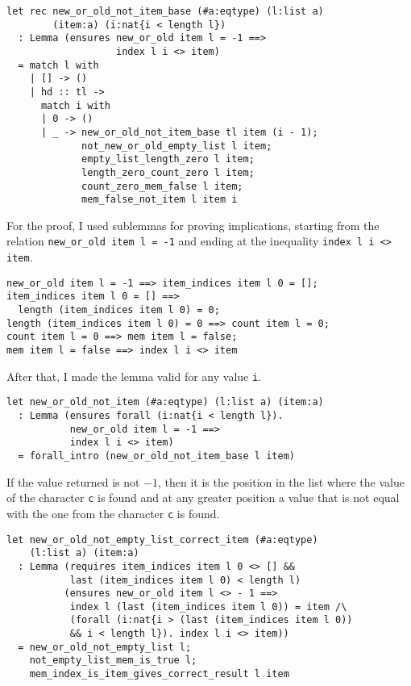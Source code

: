 \begin{verbatim}
let rec new_or_old_not_item_base (#a:eqtype) (l:list a)
        (item:a) (i:nat{i < length l})
  : Lemma (ensures new_or_old item l = -1 ==>
                   index l i <> item)
  = match l with 
    | [] -> ()
    | hd :: tl -> 
      match i with 
      | 0 -> ()
      | _ -> new_or_old_not_item_base tl item (i - 1);
             not_new_or_old_empty_list l item;
             empty_list_length_zero l item;
             length_zero_count_zero l item;
             count_zero_mem_false l item;
             mem_false_not_item l item i
\end{verbatim}

For the proof, I used sublemmas for proving implications, starting from the relation \texttt{new\_or\_old item l = -1} and ending at the inequality \texttt{index l i <> item}.

\begin{verbatim}
new_or_old item l = -1 ==> item_indices item l 0 = [];
item_indices item l 0 = [] ==> 
  length (item_indices item l 0) = 0;
length (item_indices item l 0) = 0 ==> count item l = 0;
count item l = 0 ==> mem item l = false;
mem item l = false ==> index l i <> item
\end{verbatim}

After that, I made the lemma valid for any value \texttt{i}.

\begin{verbatim}
let new_or_old_not_item (#a:eqtype) (l:list a) (item:a)
  : Lemma (ensures forall (i:nat{i < length l}).
           new_or_old item l = -1 ==> 
           index l i <> item)
  = forall_intro (new_or_old_not_item_base l item)
\end{verbatim}

If the value returned is not \(-1\), then it is the position in the list where the value of the character \texttt{c} is found and at any greater position a value that is not equal with the one from the character \texttt{c} is found.

\begin{verbatim}
let new_or_old_not_empty_list_correct_item (#a:eqtype) 
    (l:list a) (item:a)
  : Lemma (requires item_indices item l 0 <> [] &&
           last (item_indices item l 0) < length l)
          (ensures new_or_old item l <> - 1 ==> 
           index l (last (item_indices item l 0)) = item /\
           (forall (i:nat{i > (last (item_indices item l 0))
           && i < length l}). index l i <> item))
  = new_or_old_not_empty_list l;
    not_empty_list_mem_is_true l;
    mem_index_is_item_gives_correct_result l item
\end{verbatim}

